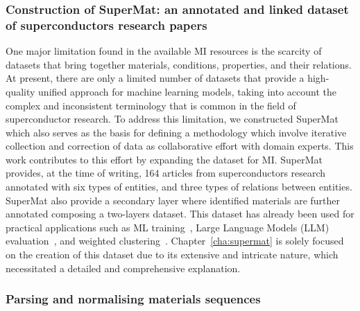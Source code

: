 \subsubsection{Construction of SuperMat: an annotated and linked dataset of superconductors research papers}
\label{sec:intro-supermat}
One major limitation found in the available MI resources is the scarcity of datasets that bring together materials, conditions, properties, and their relations. At present, there are only a limited number of datasets that provide a high-quality unified approach for machine learning models, taking into account the complex and inconsistent terminology that is common in the field of superconductor research.
To address this limitation, we constructed SuperMat which also serves as the basis for defining a methodology which involve iterative collection and correction of data as collaborative effort with domain experts. This work contributes to this effort by expanding the dataset for MI.
SuperMat provides, at the time of writing, 164 articles from superconductors research annotated with six types of entities, and three types of relations between entities. SuperMat also provide a secondary layer where identified materials are further annotated composing a two-layers dataset.
This dataset has already been used for practical applications such as ML training~\cite{foppiano2023automatic}, Large Language Models (LLM) evaluation~\cite{foppiano2024mining}, and weighted clustering~\cite{dieb2022superconductor}. 
Chapter~\ref{cha:supermat} is solely focused on the creation of this dataset due to its extensive and intricate nature, which necessitated a detailed and comprehensive explanation.

\subsubsection{Parsing and normalising materials sequences}
\label{sec:intro-material-parser}

